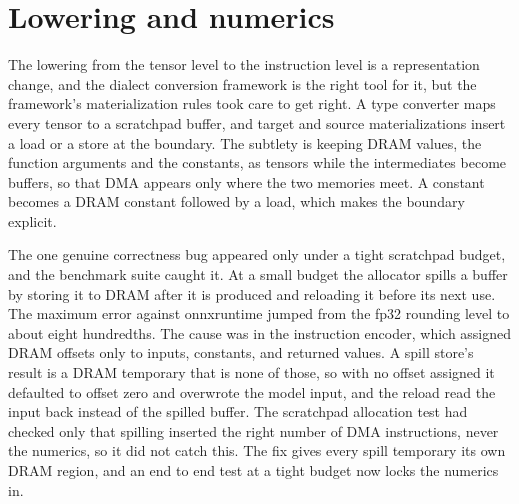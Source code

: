 \section{Lowering and numerics}

The lowering from the tensor level to the instruction level is a representation
change, and the dialect conversion framework is the right tool for it, but the
framework's materialization rules took care to get right. A type converter maps
every tensor to a scratchpad buffer, and target and source materializations insert
a load or a store at the boundary. The subtlety is keeping DRAM values, the
function arguments and the constants, as tensors while the intermediates become
buffers, so that DMA appears only where the two memories meet. A constant becomes
a DRAM constant followed by a load, which makes the boundary explicit.

The one genuine correctness bug appeared only under a tight scratchpad budget,
and the benchmark suite caught it. At a small budget the allocator spills a buffer
by storing it to DRAM after it is produced and reloading it before its next use.
The maximum error against onnxruntime jumped from the fp32 rounding level to about
eight hundredths. The cause was in the instruction encoder, which assigned DRAM
offsets only to inputs, constants, and returned values. A spill store's result is
a DRAM temporary that is none of those, so with no offset assigned it defaulted to
offset zero and overwrote the model input, and the reload read the input back
instead of the spilled buffer. The scratchpad allocation test had checked only
that spilling inserted the right number of DMA instructions, never the numerics,
so it did not catch this. The fix gives every spill temporary its own DRAM region,
and an end to end test at a tight budget now locks the numerics in.
